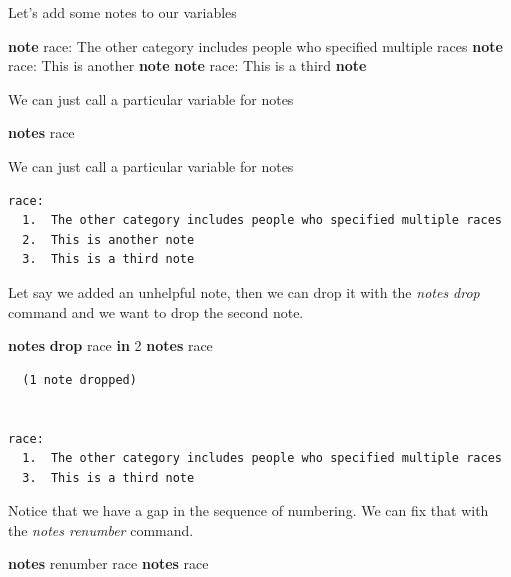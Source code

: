 \documentclass[
]{book}
\newenvironment{Shaded}{\begin{snugshade}}{\end{snugshade}}
\newcommand{\KeywordTok}[1]{\textcolor[rgb]{0.13,0.29,0.53}{\textbf{#1}}}
\newcommand{\NormalTok}[1]{#1}
\begin{document}
Let's add some notes to our variables

\begin{Shaded}
\begin{Highlighting}[]
\KeywordTok{note}\NormalTok{ race: The other category includes people who specified multiple races}
\KeywordTok{note}\NormalTok{ race: This is another }\KeywordTok{note}
\KeywordTok{note}\NormalTok{ race: This is a third }\KeywordTok{note}
\end{Highlighting}
\end{Shaded}

We can just call a particular variable for notes

\begin{Shaded}
\begin{Highlighting}[]
\KeywordTok{notes}\NormalTok{ race}
\end{Highlighting}
\end{Shaded}

We can just call a particular variable for notes

\begin{verbatim}
race:
  1.  The other category includes people who specified multiple races
  2.  This is another note
  3.  This is a third note
\end{verbatim}

Let say we added an unhelpful note, then we can drop it with the \emph{notes drop} command and we want to drop the second note.

\begin{Shaded}
\begin{Highlighting}[]
\KeywordTok{notes} \KeywordTok{drop}\NormalTok{ race }\KeywordTok{in}\NormalTok{ 2}
\KeywordTok{notes}\NormalTok{ race}
\end{Highlighting}
\end{Shaded}

\begin{verbatim}
  (1 note dropped)


race:
  1.  The other category includes people who specified multiple races
  3.  This is a third note
\end{verbatim}

Notice that we have a gap in the sequence of numbering. We can fix that with the \emph{notes renumber} command.

\begin{Shaded}
\begin{Highlighting}[]
\KeywordTok{notes}\NormalTok{ renumber race}
\KeywordTok{notes}\NormalTok{ race}
\end{Highlighting}
\end{Shaded}
\end{document}
